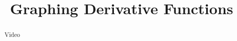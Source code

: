 \documentclass[handout]{ximera}
\title{Graphing Derivative Functions}
\begin{document}
\begin{abstract} Video %
\end{abstract}

\maketitle

\end{document}
